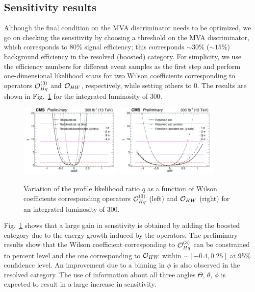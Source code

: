 \documentclass[a4paper,11pt]{article}
\begin{document}
\subsection{Sensitivity results}

Although the final condition on the MVA discriminator needs to be optimized, 
we go on checking the sensitivity by choosing a threshold on the MVA discriminator, 
which corresponds to $80\%$ signal efficiency; this corresponds $\sim 30\%$ ($\sim 15\%$) background efficiency in the resolved (boosted) category.
For simplicity, we use the efficiency numbers for different event samples as the first step and perform one-dimensional likelihood scans for two Wilson coefficients corresponding to operators ${\cal O}^{(3)}_{Hq}$ and ${\cal O}_{HW}$, respectively, while setting others to $0$. The results are shown in Fig.~\ref{fig:NLL} for the integrated luminosity of 300\fbinv.
\begin{figure}[hbtp]
\begin{center}
\includegraphics[width=0.45\textwidth]{Figures/RECO/Full_NLL_WC_cpq3i_fine_300fb_opt1.png}
\includegraphics[width=0.45\textwidth]{Figures/RECO/Full_NLL_WC_cpW_fine_300fb.png}
\end{center}
\caption{
Variation of the profile likelihood ratio $q$ as a function of Wilson coefficients corresponding operators ${\cal O}^{(3)}_{Hq}$ (left) and ${\cal O}_{HW}$ (right) for an integrated luminosity of 300\fbinv.
}
\label{fig:NLL}
\end{figure}
Fig.~\ref{fig:NLL} shows that a large gain in sensitivity is obtained by adding the boosted category due to the energy growth induced by the operators. 
The preliminary results show that the Wilson coefficient corresponding to ${\cal O}^{(3)}_{Hq}$ can be constrained to percent level and the one corresponding to ${\cal O}_{HW}$ within $\sim [-0.4,0.25]$ at 95\% confidence level. 
An improvement due to a binning in $\phi$ is also observed in the resolved category.
The use of information about all three angles $\Theta$, $\theta$, $\phi$ is expected to result in a large increase in sensitivity.
\end{document}
